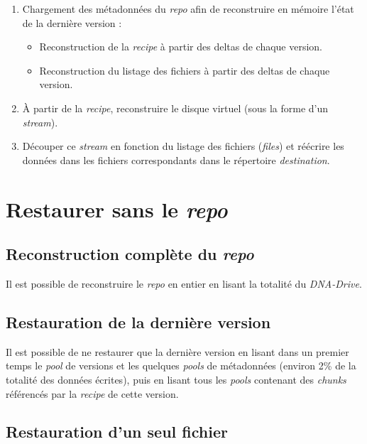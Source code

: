 \documentclass[a4paper]{report}
\begin{document}
\begin{enumerate}
\item
  Chargement des métadonnées du \emph{repo} afin de reconstruire en
  mémoire l'état de la dernière version :

  \begin{itemize}
  \item
    Reconstruction de la \emph{recipe} à partir des deltas de chaque
    version.
  \item
    Reconstruction du listage des fichiers à partir des deltas de chaque
    version.
  \end{itemize}
\item
  À partir de la \emph{recipe}, reconstruire le disque virtuel (sous la
  forme d'un \emph{stream}).
\item
  Découper ce \emph{stream} en fonction du listage des fichiers
  (\emph{files}) et réécrire les données dans les fichiers
  correspondants dans le répertoire \emph{destination}.
\end{enumerate}

\section{\texorpdfstring{Restaurer sans le
\emph{repo}}{Restaurer sans le repo}}

\subsection{\texorpdfstring{Reconstruction complète du
\emph{repo}}{Reconstruction complète du repo}}

Il est possible de reconstruire le \emph{repo} en entier en lisant la
totalité du \emph{DNA-Drive}.

\subsection{Restauration de la dernière
version}

Il est possible de ne restaurer que la dernière version en lisant dans
un premier temps le \emph{pool} de versions et les quelques \emph{pools}
de métadonnées (environ 2\% de la totalité des données écrites), puis en
lisant tous les \emph{pools} contenant des \emph{chunks} référencés par
la \emph{recipe} de cette version.

\subsection{Restauration d'un seul
fichier}
\end{document}
